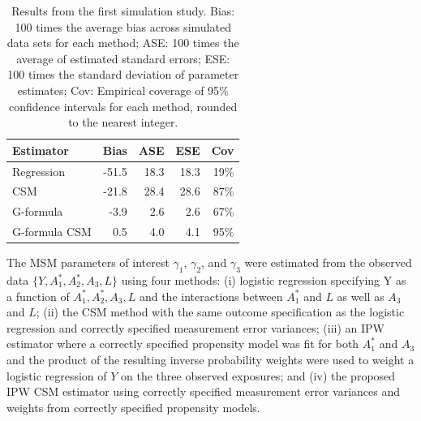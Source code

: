 \documentclass[useAMS,usenatbib,referee]{biom}
\begin{document}
\begin{table}[]
    \centering
    \caption{Results from the first simulation study. Bias: 100 times the average bias across simulated data sets for each method; ASE: 100 times the average of estimated standard errors; ESE: 100 times the standard deviation of parameter estimates; Cov: Empirical coverage of 95$\%$ confidence intervals for each method, rounded to the nearest integer.}
    \begin{tabular}{lrrrr}
    \hline
         Estimator & Bias & ASE & ESE & Cov \\
         \hline
Regression & -51.5 & 18.3 & 18.3 & 19\% \\
CSM & -21.8 & 28.4 & 28.6 & 87\% \\
G-formula & -3.9 & 2.6 & 2.6 & 67\% \\
G-formula CSM & 0.5 & 4.0 & 4.1 & 95\% \\
         \hline
    \end{tabular}
    \label{tab:one}
\end{table}

The MSM parameters of interest $\gamma_{1}$, $\gamma_{2}$, and $\gamma_{3}$ were estimated from the observed data $\{ Y, A_{1}^{*}, A_{2}^{*}, A_{3}, L \}$ using four methods: (i) logistic regression specifying Y as a function of $A_{1}^{*}, A_{2}^{*}, A_{3}, L$ and the interactions between $A_{1}^{*}$ and $L$ as well as $A_{3}$ and $L$; (ii) the CSM method with the same outcome specification as the logistic regression and correctly specified measurement error variances; (iii) an IPW estimator where a correctly specified propensity model was fit for both $A_{1}^{*}$ and $A_{3}$ and the product of the resulting inverse probability weights were used to weight a logistic regression of $Y$ on the three observed exposures; and (iv) the proposed IPW CSM estimator using correctly specified measurement error variances and weights from correctly specified propensity models.
\end{document}
